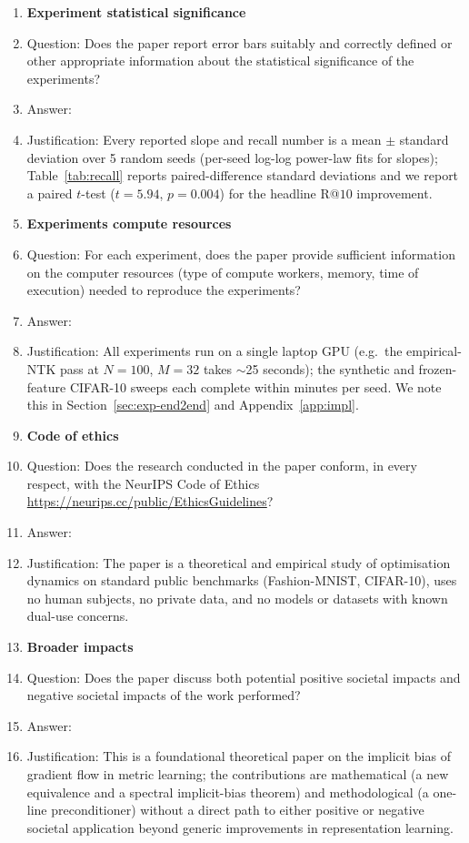\begin{enumerate}
\item {\bf Experiment statistical significance}
    \item[] Question: Does the paper report error bars suitably and correctly defined or other appropriate information about the statistical significance of the experiments?
    \item[] Answer: \answerYes{}
    \item[] Justification: Every reported slope and recall number is a mean $\pm$ standard deviation over 5 random seeds (per-seed log-log power-law fits for slopes); Table~\ref{tab:recall} reports paired-difference standard deviations and we report a paired $t$-test ($t = 5.94$, $p = 0.004$) for the headline R@$10$ improvement.

\item {\bf Experiments compute resources}
    \item[] Question: For each experiment, does the paper provide sufficient information on the computer resources (type of compute workers, memory, time of execution) needed to reproduce the experiments?
    \item[] Answer: \answerYes{}
    \item[] Justification: All experiments run on a single laptop GPU (e.g.\ the empirical-NTK pass at $N=100$, $M=32$ takes $\sim$25 seconds); the synthetic and frozen-feature CIFAR-10 sweeps each complete within minutes per seed. We note this in Section~\ref{sec:exp-end2end} and Appendix~\ref{app:impl}.

\item {\bf Code of ethics}
    \item[] Question: Does the research conducted in the paper conform, in every respect, with the NeurIPS Code of Ethics \url{https://neurips.cc/public/EthicsGuidelines}?
    \item[] Answer: \answerYes{}
    \item[] Justification: The paper is a theoretical and empirical study of optimisation dynamics on standard public benchmarks (Fashion-MNIST, CIFAR-10), uses no human subjects, no private data, and no models or datasets with known dual-use concerns.

\item {\bf Broader impacts}
    \item[] Question: Does the paper discuss both potential positive societal impacts and negative societal impacts of the work performed?
    \item[] Answer: \answerNA{}
    \item[] Justification: This is a foundational theoretical paper on the implicit bias of gradient flow in metric learning; the contributions are mathematical (a new equivalence and a spectral implicit-bias theorem) and methodological (a one-line preconditioner) without a direct path to either positive or negative societal application beyond generic improvements in representation learning.


\end{enumerate}
